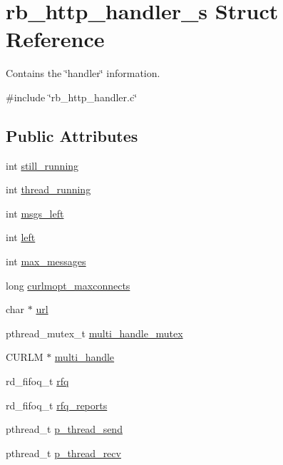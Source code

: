 \hypertarget{structrb__http__handler__s}{\section{rb\-\_\-http\-\_\-handler\-\_\-s Struct Reference}
\label{structrb__http__handler__s}
}


Contains the \char`\"{}handler\char`\"{} information.  




{\ttfamily \#include \char`\"{}rb\-\_\-http\-\_\-handler.\-c\char`\"{}}

\subsection*{Public Attributes}
\begin{DoxyCompactItemize}
\item 
int \hyperlink{structrb__http__handler__s_aa49e97bedda03106912088dad0b75e64}{still\-\_\-running}
\item 
int \hyperlink{structrb__http__handler__s_a978656c7c89a80d411121107c97a0dcd}{thread\-\_\-running}
\item 
int \hyperlink{structrb__http__handler__s_a803db851c00a617f8a80f00f29d9dba3}{msgs\-\_\-left}
\item 
int \hyperlink{structrb__http__handler__s_a6239490836609d286669af640028ae71}{left}
\item 
int \hyperlink{structrb__http__handler__s_ac8ff888740fc0f4c4365fa08fc7d044f}{max\-\_\-messages}
\item 
long \hyperlink{structrb__http__handler__s_a85973abbda4aeb9332a1b59d6aec69a7}{curlmopt\-\_\-maxconnects}
\item 
char $\ast$ \hyperlink{structrb__http__handler__s_a1f0df317f6eca7893bb08a54f13870ef}{url}
\item 
pthread\-\_\-mutex\-\_\-t \hyperlink{structrb__http__handler__s_add4e2b7495e2f20396c2e70ab1a27bf4}{multi\-\_\-handle\-\_\-mutex}
\item 
C\-U\-R\-L\-M $\ast$ \hyperlink{structrb__http__handler__s_a45c0ce1f2e4d154d0194bb60569c0faf}{multi\-\_\-handle}
\item 
rd\-\_\-fifoq\-\_\-t \hyperlink{structrb__http__handler__s_a39160211aefb64ec052138229da98632}{rfq}
\item 
rd\-\_\-fifoq\-\_\-t \hyperlink{structrb__http__handler__s_a383f2047cfcdd9fe49d0deacf770a73c}{rfq\-\_\-reports}
\item 
pthread\-\_\-t \hyperlink{structrb__http__handler__s_ae969c34a0421fe32951cb31802735f13}{p\-\_\-thread\-\_\-send}
\item 
pthread\-\_\-t \hyperlink{structrb__http__handler__s_a4d36d51983f56eac71371a39ee421242}{p\-\_\-thread\-\_\-recv}
\end{DoxyCompactItemize}


